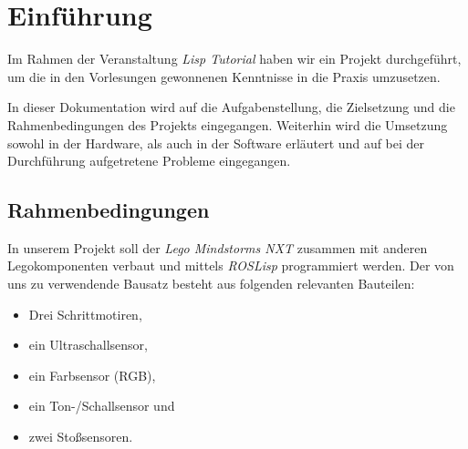 \documentclass{fetch-my-doc}
\begin{document}
	\sloppy
	
	\addtolength{\textheight}{\versch}
	\printtodo
	\tableofcontents
	\clearpage
	
	
	
	\section{Einführung}\label{sec:Einfuehrung}
		
		Im Rahmen der Veranstaltung \textit{Lisp Tutorial} haben wir ein Projekt durchgeführt, um die in den Vorlesungen gewonnenen Kenntnisse in die Praxis umzusetzen.
		
		In dieser Dokumentation wird auf die Aufgabenstellung, die Zielsetzung und die Rahmenbedingungen des Projekts eingegangen. Weiterhin wird die Umsetzung sowohl in der Hardware, als auch in der Software erläutert und auf bei der Durchführung aufgetretene Probleme eingegangen.
    
    \subsection{Rahmenbedingungen}\label{sec:rahmenbedingungen}
      In unserem Projekt soll der \textit{Lego Mindstorms NXT} zusammen mit anderen Legokomponenten verbaut und mittels \textit{ROSLisp} programmiert werden.
      Der von uns zu verwendende Bausatz besteht aus folgenden relevanten Bauteilen:
      \begin{itemize}
        \item Drei Schrittmotiren,
        \item ein Ultraschallsensor,
        \item ein Farbsensor (RGB),
        \item ein Ton-/Schallsensor und
        \item zwei Stoßsensoren.
      \end{itemize}
    
\end{document}
